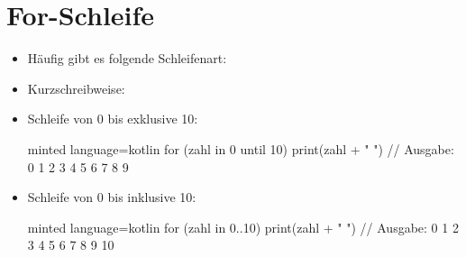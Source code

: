 \section{For-Schleife}
\begin{frame}
    \slidehead

    \begin{itemize}
        \item Häufig gibt es folgende Schleifenart:
            \pause
        \item Kurzschreibweise:
    \end{itemize}%
\end{frame}

\begin{frame}[fragile]
    \slidehead

    \begin{itemize}
        \item Schleife von 0 bis exklusive 10:
            \begin{codeBlock}[]{minted language=kotlin}
                for (zahl in 0 until 10) {
                    print(zahl + " ")
                } // Ausgabe: 0 1 2 3 4 5 6 7 8 9
            \end{codeBlock}
            \pause
        \item Schleife von 0 bis inklusive 10:
            \begin{codeBlock}[]{minted language=kotlin}
                for (zahl in 0..10) {
                    print(zahl + " ")
                } // Ausgabe: 0 1 2 3 4 5 6 7 8 9 10
            \end{codeBlock}
    \end{itemize}
\end{frame}



